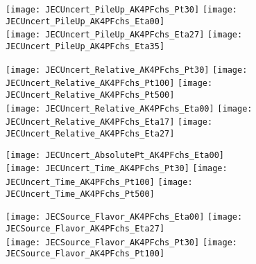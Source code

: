 \documentclass[landscape,10pt]{beamer} %
\begin{document}
\newpage

\begin{figure}[p]
\centering
  \texttt{[image: JECUncert\_PileUp\_AK4PFchs\_Pt30]}
  \texttt{[image: JECUncert\_PileUp\_AK4PFchs\_Eta00]}\\
  \texttt{[image: JECUncert\_PileUp\_AK4PFchs\_Eta27]}
  \texttt{[image: JECUncert\_PileUp\_AK4PFchs\_Eta35]}
\end{figure}

\newpage 

\begin{figure}[p]
\centering
  \texttt{[image: JECUncert\_Relative\_AK4PFchs\_Pt30]}
  \texttt{[image: JECUncert\_Relative\_AK4PFchs\_Pt100]}
  \texttt{[image: JECUncert\_Relative\_AK4PFchs\_Pt500]}\\
  \texttt{[image: JECUncert\_Relative\_AK4PFchs\_Eta00]}
  \texttt{[image: JECUncert\_Relative\_AK4PFchs\_Eta17]}
  \texttt{[image: JECUncert\_Relative\_AK4PFchs\_Eta27]}
\end{figure}

\newpage

\begin{figure}[p]
\centering
  \texttt{[image: JECUncert\_AbsolutePt\_AK4PFchs\_Eta00]}\\
  \texttt{[image: JECUncert\_Time\_AK4PFchs\_Pt30]}
  \texttt{[image: JECUncert\_Time\_AK4PFchs\_Pt100]}
  \texttt{[image: JECUncert\_Time\_AK4PFchs\_Pt500]}
\end{figure}

\newpage

\begin{figure}[p]
\centering
\texttt{[image: JECSource\_Flavor\_AK4PFchs\_Eta00]}
\texttt{[image: JECSource\_Flavor\_AK4PFchs\_Eta27]}\\
\texttt{[image: JECSource\_Flavor\_AK4PFchs\_Pt30]}
\texttt{[image: JECSource\_Flavor\_AK4PFchs\_Pt100]}
\end{figure}
\end{document}
